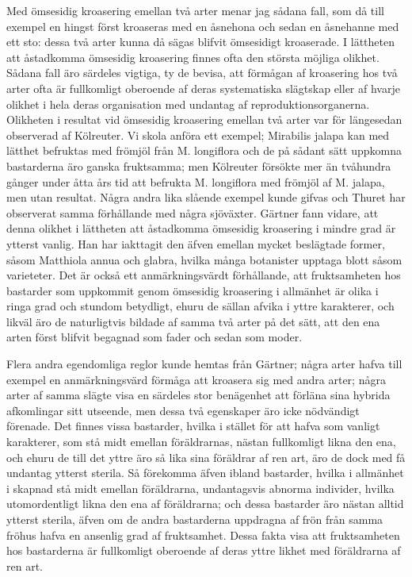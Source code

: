 Med ömsesidig kroasering emellan två arter menar jag sådana fall, som då till exempel en hingst först kroaseras med en åsnehona och sedan en åsnehanne med ett sto: dessa två arter kunna då sägas blifvit ömsesidigt kroaserade. I lättheten att åstadkomma ömsesidig kroasering finnes ofta den största möjliga olikhet. Sådana fall äro särdeles vigtiga, ty de bevisa, att förmågan af kroasering hos två arter ofta är fullkomligt oberoende af deras systematiska slägtskap eller af hvarje olikhet i hela deras organisation med undantag af reproduktionsorganerna. Olikheten i resultat vid ömsesidig kroasering emellan två arter var för längesedan observerad af Kölreuter. Vi skola anföra ett exempel; Mirabilis jalapa kan med lätthet befruktas med frömjöl från M. longiflora och de på sådant sätt uppkomna bastarderna äro ganska fruktsamma; men Kölreuter försökte mer än tvåhundra gånger under åtta års tid att befrukta M. longiflora med frömjöl af M. jalapa, men utan resultat. Några andra lika slående exempel kunde gifvas och Thuret har observerat samma förhållande med några sjöväxter. Gärtner fann vidare, att denna olikhet i lättheten att åstadkomma ömsesidig kroasering i mindre grad är ytterst vanlig. Han har iakttagit den äfven emellan mycket beslägtade former, såsom Matthiola annua och glabra, hvilka många botanister upptaga blott såsom varieteter. Det är också ett anmärkningsvärdt förhållande, att fruktsamheten hos bastarder som uppkommit genom ömsesidig kroasering i allmänhet är olika i ringa grad och stundom betydligt, ehuru de sällan afvika i yttre karakterer, och likväl äro de naturligtvis bildade af samma två arter på det sätt, att den ena arten först blifvit begagnad som fader och sedan som moder.

Flera andra egendomliga reglor kunde hemtas från Gärtner; några arter hafva till exempel en anmärkningsvärd förmåga att kroasera sig med andra arter; några arter af samma slägte visa en särdeles stor benägenhet att förläna sina hybrida afkomlingar sitt utseende, men dessa två egenskaper äro icke nödvändigt förenade. Det finnes vissa bastarder, hvilka i stället för att hafva som vanligt karakterer, som stå midt emellan föräldrarnas, nästan fullkomligt likna den ena, och ehuru de till det yttre äro så lika sina föräldrar af ren art, äro de dock med få undantag ytterst sterila. Så förekomma äfven ibland bastarder, hvilka i allmänhet i skapnad stå midt emellan föräldrarna, undantagsvis abnorma individer, hvilka utomordentligt likna den ena af föräldrarna; och dessa bastarder äro nästan alltid ytterst sterila, äfven om de andra bastarderna uppdragna af frön från samma fröhus hafva en ansenlig grad af fruktsamhet. Dessa fakta visa att fruktsamheten hos bastarderna är fullkomligt oberoende af deras yttre likhet med föräldrarna af ren art.

